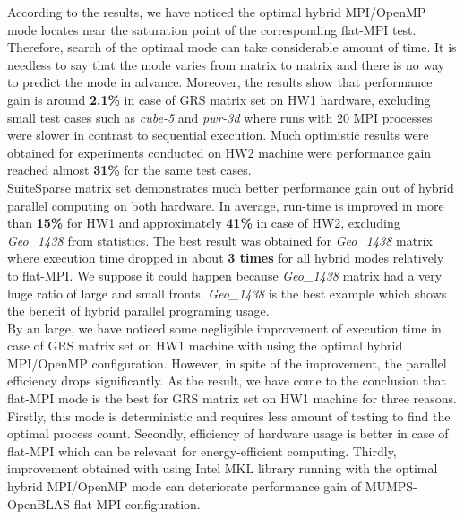 According to the results, we have noticed the optimal hybrid MPI/OpenMP mode locates near the saturation point of the corresponding flat-MPI test. Therefore, search of the optimal mode can take considerable amount of time. It is needless to say that the mode varies from matrix to matrix and there is no way to predict the mode in advance. Moreover, the results show that performance gain is around \textbf{2.1\%} in case of GRS matrix set on HW1 hardware, excluding small test cases such as \textit{cube-5} and \textit{pwr-3d} where runs with 20 MPI processes were slower in contrast to sequential execution. Much optimistic results were obtained for experiments conducted on HW2 machine were performance gain reached almost \textbf{31\%} for the same test cases.\\


SuiteSparse matrix set demonstrates much better performance gain out of hybrid parallel computing on both hardware. In average, run-time is improved in more than \textbf{15\%} for HW1 and approximately \textbf{41\%} in case of HW2, excluding \textit{Geo\_1438} from statistics. The best result was obtained for \textit{Geo\_1438} matrix where execution time dropped in about \textbf{3 times} for all hybrid modes relatively to flat-MPI. We suppose it could happen because \textit{Geo\_1438} matrix had a very huge ratio of large and small fronts. \textit{Geo\_1438} is the best example which shows the benefit of hybrid parallel programing usage.\\


By an large, we have noticed some negligible improvement of execution time in case of GRS matrix set on HW1 machine with using the optimal hybrid MPI/OpenMP configuration. However, in spite of the improvement, the parallel efficiency drops significantly. As the result, we have come to the conclusion that flat-MPI mode is the best for GRS matrix set on HW1 machine for three reasons. Firstly, this mode is deterministic and requires less amount of testing to find the optimal process count. Secondly, efficiency of hardware usage is better in case of flat-MPI which can be relevant for energy-efficient computing. Thirdly, improvement obtained with using Intel MKL library running with the optimal hybrid MPI/OpenMP mode can deteriorate performance gain of MUMPS-OpenBLAS flat-MPI configuration.\\ 